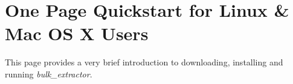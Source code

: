 \documentclass[11pt]{article} %
\begin{document}
\newcommand \bulk {\textit{bulk\_extractor}\xspace}
\newcommand \beapi {\textit{be13\_api}\xspace}
\newcommand \viewer {\textbf{Bulk Extractor Viewer}\xspace}





\setlength{\parindent}{0pt} %
\newpage
\thispagestyle{empty}
\mbox{}
\newpage
\section*{One Page Quickstart for Linux \& Mac OS X Users}
This page provides a very brief introduction to downloading, installing and running \bulk. 
\end{document}
